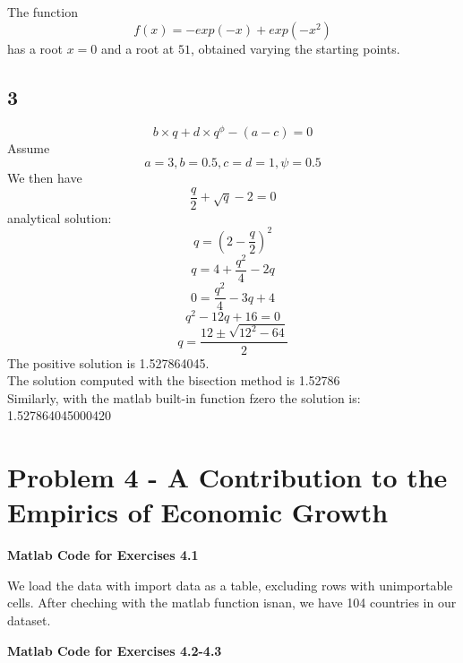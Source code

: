 \documentclass{article}
\begin{document}
The function $$f(x) = -exp(-x) + exp(-x^2) $$ has a root $x = 0$ and a root at $51$, obtained varying the starting points.

\subsection*{3}
$$b \times q + d \times q^\phi - (a - c) = 0 $$
Assume $$ a = 3, b = 0.5, c = d = 1, \psi = 0.5$$
We then have $$ \dfrac{q}{2} + \sqrt{q} -2 = 0 $$
  analytical solution:   \\
$$ q = (2 - \dfrac{q}{2})^2$$
$$ q = 4 +\dfrac{q^2}{4} - 2q  $$
$$ 0 = \dfrac{q^2}{4} - 3q + 4 $$
$$ q^2 - 12q + 16 = 0$$
$$ q = \dfrac{12 \pm \sqrt{12^2 - 64}}{2}$$
The positive solution is 1.527864045. \\
  The solution computed with the bisection method is 1.52786 \\
  Similarly, with the matlab built-in function fzero the solution is: 1.527864045000420 \\
  
  
  \section*{Problem 4 - A Contribution to the Empirics of Economic Growth}
   \begin{center}
      \textbf{Matlab Code for Exercises 4.1}
  \end{center}
  We load the data with import data as a table, excluding rows with unimportable cells. After cheching with the matlab function isnan, we have 104 countries in our dataset.\\
  \begin{center}
      \textbf{Matlab Code for Exercises 4.2-4.3}
  \end{center}

\end{document}
